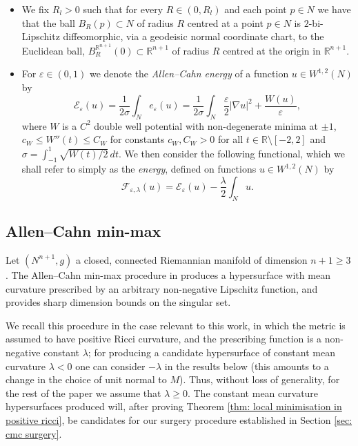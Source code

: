 \documentclass[11pt]{article}
\begin{document}
\begin{itemize}
    \item We fix $R_l > 0$ such that for every $R \in (0,R_l)$ and each point $p \in N$ we have that the ball $B_R(p) \subset N$ of radius $R$ centred at a point $p \in N$ is $2$-bi-Lipschitz diffeomorphic, via a geodeisic normal coordinate chart, to the Euclidean ball, $B^{\mathbb{R}^{n+1}}_R(0) \subset \mathbb{R}^{n+1}$ of radius $R$ centred at the origin in $\mathbb{R}^{n+1}$.

    \item For $\varepsilon \in (0,1)$ we denote the \textit{Allen--Cahn energy} of a function $u \in W^{1,2}(N)$ by 
    \begin{equation*}
    \mathcal{E}_\varepsilon(u) =  \frac{1}{2\sigma} \int_N e_\varepsilon(u) = \frac{1}{2\sigma} \int_N \frac{\varepsilon}{2}|\nabla u|^2 + \frac{W(u)}{\varepsilon}, 
    \end{equation*} 
    where $W$ is a $C^2$ double well potential with non-degenerate minima at $\pm 1$, $c_W \leq W''(t) \leq C_W$ for constants $c_W, C_W > 0$ for all $t \in \mathbb{R} \setminus [-2,2]$ and $\sigma = \int_{-1}^1 \sqrt{W(t)/2} \, dt$. We then consider the following functional, which we shall refer to simply as the \textit{energy}, defined on functions $u \in W^{1,2}(N)$ by 
    \begin{equation*}
    \mathcal{F}_{\varepsilon,\lambda}(u) = \mathcal{E}_\varepsilon(u) - \frac{\lambda}{2}\int_N u.
    \end{equation*}

   
    
\end{itemize}

\subsection{Allen--Cahn min-max}\label{subsec: Allen--Cahn minmax}

Let $(N^{n+1},g)$ a closed, connected Riemannian manifold of dimension $n+1 \geq 3$. The Allen--Cahn min-max procedure in \cite{bellettini-wickramasekera} produces a hypersurface with mean curvature prescribed by an arbitrary non-negative Lipschitz function, and provides sharp dimension bounds on the singular set.

\bigskip

We recall this procedure in the case relevant to this work, in which the metric is assumed to have positive Ricci curvature, and the prescribing function is a non-negative constant $\lambda$; for producing a candidate hypersurface of constant mean curvature $\lambda < 0$ one can consider $-\lambda$ in the results below (this amounts to a change in the choice of unit normal to $M$). Thus, without loss of generality, for the rest of the paper we assume that $\lambda \geq 0$. The constant mean curvature hypersurfaces produced will, after proving Theorem \ref{thm: local minimisation in positive ricci}, be candidates for our surgery procedure established in Section \ref{sec: cmc surgery}.
\end{document}
